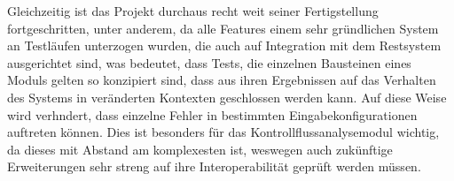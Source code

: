 \documentclass[11pt]{article}
\begin{document}
Gleichzeitig ist das Projekt durchaus recht weit seiner Fertigstellung fortgeschritten, unter
anderem, da alle Features einem sehr gründlichen System an Testläufen unterzogen wurden, die auch
auf Integration mit dem Restsystem ausgerichtet sind, was bedeutet, dass Tests, die einzelnen
Bausteinen eines Moduls gelten so konzipiert sind, dass aus ihren Ergebnissen auf das Verhalten des
Systems in veränderten Kontexten geschlossen werden kann. Auf diese Weise wird verhndert, dass
einzelne Fehler in bestimmten Eingabekonfigurationen auftreten können. Dies ist besonders für das
Kontrollflussanalysemodul wichtig, da dieses mit Abstand am komplexesten ist, weswegen auch
zukünftige Erweiterungen sehr streng auf ihre Interoperabilität geprüft werden müssen.



\end{document}
